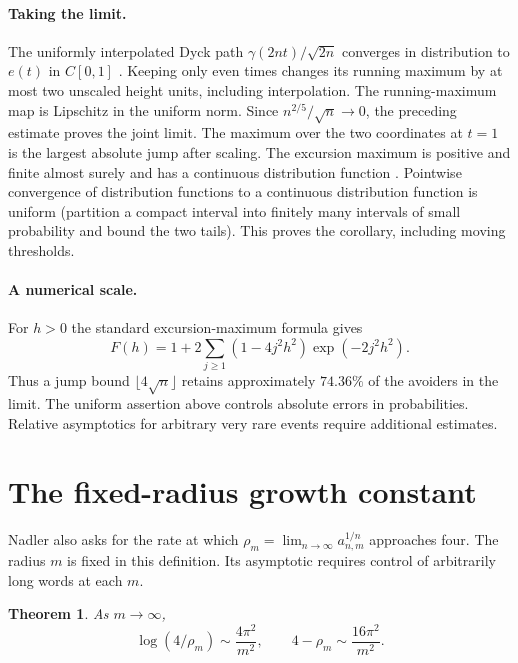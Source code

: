 \documentclass[11pt]{article}
\newtheorem{theorem}{Theorem}
\begin{document}
\paragraph{Taking the limit.}
The uniformly interpolated Dyck path $\gamma(2nt)/\sqrt{2n}$ converges in distribution to $e(t)$ in $C[0,1]$ \cite[Thm.~1.2]{hrs}. Keeping only even times changes its running maximum by at most two unscaled height units, including interpolation. The running-maximum map is Lipschitz in the uniform norm. Since $n^{2/5}/\sqrt n\to0$, the preceding estimate proves the joint limit. The maximum over the two coordinates at $t=1$ is the largest absolute jump after scaling. The excursion maximum is positive and finite almost surely and has a continuous distribution function \cite{py}. Pointwise convergence of distribution functions to a continuous distribution function is uniform (partition a compact interval into finitely many intervals of small probability and bound the two tails). This proves the corollary, including moving thresholds.

\paragraph{A numerical scale.}
For $h>0$ the standard excursion-maximum formula \cite{py} gives
\[
 F(h)=1+2\sum_{j\ge1}(1-4j^2h^2)\exp(-2j^2h^2).
\]
Thus a jump bound $\lfloor4\sqrt n\rfloor$ retains approximately $74.36\%$ of the avoiders in the limit. The uniform assertion above controls absolute errors in probabilities. Relative asymptotics for arbitrary very rare events require additional estimates.
\section*{The fixed-radius growth constant}
Nadler \cite[\S9.4]{nadler} also asks for the rate at which $\rho_m=\lim_{n\to\infty}a_{n,m}^{1/n}$ approaches four. The radius $m$ is fixed in this definition. Its asymptotic requires control of arbitrarily long words at each $m$.

\begin{theorem}
As $m\to\infty$,
\[
 \log(4/\rho_m)\sim\frac{4\pi^2}{m^2},
 \qquad 4-\rho_m\sim\frac{16\pi^2}{m^2}.
\]
\end{theorem}
\end{document}
